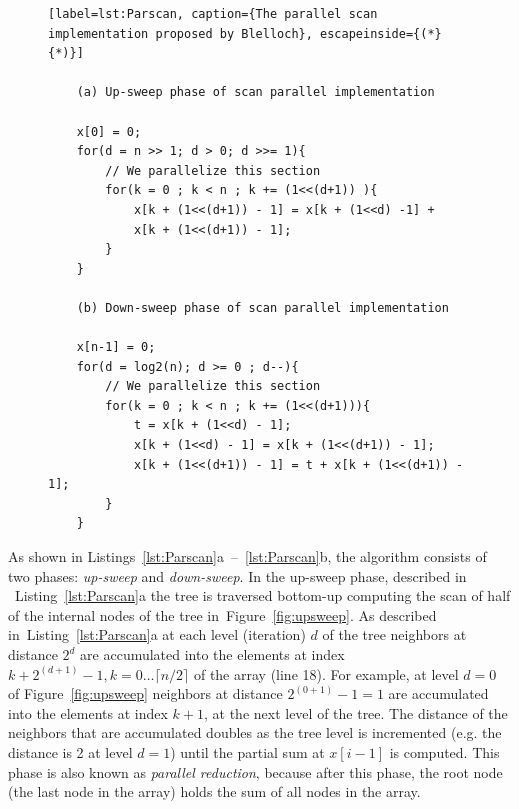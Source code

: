 \documentclass[Ingles]{ic-tese-v1}
\newcommand{\rfig}[1]{Figure~\ref{fig:#1}}
\newcommand{\rlsts}[2]{Listing~\ref{lst:#1}{#2}}
\newcommand{\rlstn}[3]{Listings~\ref{lst:#1}{#2}~--~\ref{lst:#1}{#3}}
\begin{document}
\begin{figure}[t]
	\lstset{basicstyle=\scriptsize}
	\begin{lstlisting}[label=lst:Parscan, caption={The parallel scan implementation proposed by Blelloch}, escapeinside={(*}{*)}]

	(a) Up-sweep phase of scan parallel implementation

	x[0] = 0;
	for(d = n >> 1; d > 0; d >>= 1){
		// We parallelize this section
		for(k = 0 ; k < n ; k += (1<<(d+1)) ){
			x[k + (1<<(d+1)) - 1] = x[k + (1<<d) -1] +
			x[k + (1<<(d+1)) - 1];
		}
	}

	(b) Down-sweep phase of scan parallel implementation

	x[n-1] = 0;
	for(d = log2(n); d >= 0 ; d--){
		// We parallelize this section
		for(k = 0 ; k < n ; k += (1<<(d+1))){
			t = x[k + (1<<d) - 1];
			x[k + (1<<d) - 1] = x[k + (1<<(d+1)) - 1];
			x[k + (1<<(d+1)) - 1] = t + x[k + (1<<(d+1)) - 1];
		}
	}
	\end{lstlisting}
\end{figure}

As  shown  in \rlstn{Parscan}{a}{b},  the  algorithm  consists of  two phases:
\textit{up-sweep} and  \textit{down-sweep}.  In  the up-sweep phase,  described
in  ~\rlsts{Parscan}{a}  the  tree   is  traversed bottom-up computing the scan
of half of the internal nodes of the tree in~\rfig{upsweep}.  As described
in~\rlsts{Parscan}{a} at each level (iteration)  $d$  of   the  tree  neighbors
at   distance  $2^d$  are accumulated       into        the       elements
at       index $k + 2^{(d+1)} - 1, k = 0 \ldots \lceil n/2 \rceil$ of the array
(line 18). For  example, at  level $d  = 0$  of \rfig{upsweep}  neighbors at
distance $2^{(0+1)}  - 1  = 1$  are accumulated  into the  elements at index $k
+ 1$, at the  next level of  the tree.  The distance  of the neighbors  that
are   accumulated  doubles  as  the   tree  level  is incremented  (e.g.  the
distance is  2 at  level $d  = 1$)  until the partial sum  at $x[i-1]$  is
computed.   This phase  is also  known as \textit{parallel reduction},  because
after this phase,  the root node (the last node in the array) holds the sum of
all nodes in the array.
\end{document}
